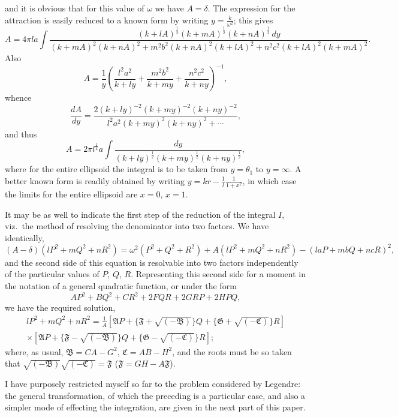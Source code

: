 \documentclass[11pt,a4paper]{article}
\theoremstyle{definition}
\begin{document}
\newpage

\setcounter{page}{437}

and it is obvious that for this value of $\omega$ we have $A = \delta$. The expression for the attraction is easily reduced to a known form by writing $y = \frac{k}{\omega^{2}}$; this gives
\[
A = 4\pi la \int \frac{(k + lA)^{\frac{1}{2}}(k + mA)^{\frac{1}{2}}(k + nA)^{\frac{1}{2}}\, dy}{(k + mA)^{2}(k + nA)^{2} + m^{2}b^{2}(k + nA)^{2}(k + lA)^{2} + n^{2}c^{2}(k + lA)^{2}(k + mA)^{2}}.
\]
Also
\[
A = \frac{1}{y}\left(\frac{l^{2}a^{2}}{k + ly} + \frac{m^{2}b^{2}}{k + my} + \frac{n^{2}c^{2}}{k + ny}\right)^{-1},
\]
whence
\[
\frac{dA}{dy} = \frac{2(k + ly)^{-2}(k + my)^{-2}(k + ny)^{-2}}{l^{2}a^{2}(k + my)^{2}(k + ny)^{2} + \cdots},
\]
and thus
\[
A = 2\pi l^{\frac{1}{2}}a \int \frac{dy}{(k + ly)^{\frac{1}{2}}(k + my)^{\frac{1}{2}}(k + ny)^{\frac{1}{2}}},
\]
where for the entire ellipsoid the integral is to be taken from $y = \theta_{1}$ to $y = \infty$. A better known form is readily obtained by writing $y = kr - \frac{1}{l}\frac{1}{1 + x^{2}}$, in which case the limits for the entire ellipsoid are $x = 0$, $x = 1$.

It may be as well to indicate the first step of the reduction of the integral $I$, viz.\ the method of resolving the denominator into two factors. We have identically,
\[
(A - \delta)(lP^{2} + mQ^{2} + nR^{2}) = \omega^{2}(P^{2} + Q^{2} + R^{2}) + A(lP^{2} + mQ^{2} + nR^{2}) - (laP + mbQ + ncR)^{2},
\]
and the second side of this equation is resolvable into two factors independently of the particular values of $P$, $Q$, $R$. Representing this second side for a moment in the notation of a general quadratic function, or under the form
\[
AP^{2} + BQ^{2} + CR^{2} + 2FQR + 2GRP + 2HPQ,
\]
we have the required solution,
\begin{multline*}
lP^{2} + mQ^{2} + nR^{2} = \frac{1}{A}\left[\mathfrak{A}P + \{\mathfrak{F} + \sqrt{(-\mathfrak{B})}\}Q + \{\mathfrak{G} + \sqrt{(-\mathfrak{C})}\}R\right] \\
\times \left[\mathfrak{A}P + \{\mathfrak{F} - \sqrt{(-\mathfrak{B})}\}Q + \{\mathfrak{G} - \sqrt{(-\mathfrak{C})}\}R\right];
\end{multline*}
where, as usual, $\mathfrak{B} = CA - G^{2}$, $\mathfrak{C} = AB - H^{2}$, and the roots must be so taken that $\sqrt{(-\mathfrak{B})}\sqrt{(-\mathfrak{C})} = \mathfrak{F}$ ($\mathfrak{F} = GH - A\mathfrak{F}$).

I have purposely restricted myself so far to the problem considered by Legendre: the general transformation, of which the preceding is a particular case, and also a simpler mode of effecting the integration, are given in the next part of this paper.
\end{document}
